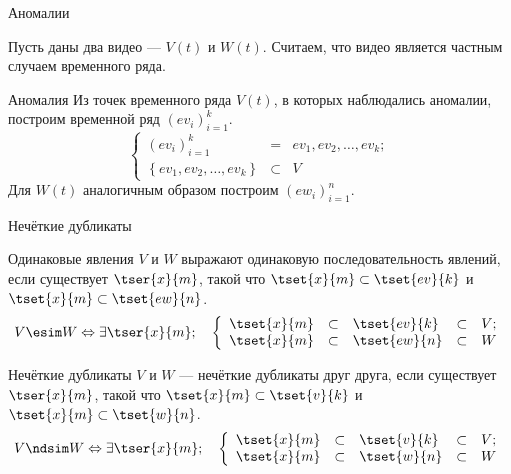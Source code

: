 \begin{frame}{Аномалии}
    \begin{blue-box}{}
        Пусть даны два видео — $V(t)$ и $W(t)$.
        Считаем, что видео является частным случаем временного ряда.
    \end{blue-box}
    \vspace{12pt}
    \begin{blue-box}{Аномалия}
        Из точек временного ряда $V(t)$, в которых наблюдались аномалии, 
        построим временной ряд $(ev_{i})^{k}_{i=1}$.
        \[
            \left\lbrace
                \begin{array}{lcl}
                    (ev_{i})^{k}_{i=1} & = &  ev_1, ev_2, \ldots, ev_k; \\
                    \left\lbrace ev_1, ev_2, \ldots, ev_k  \right\rbrace & \subset & V 
                \end{array}
            \right.
        \]
        Для $W(t)$ аналогичным образом построим  $(ew_{i})^{n}_{i=1}$.
    \end{blue-box}
\end{frame}



\begin{frame}{Нечёткие дубликаты}
    \begin{orange-box}{Одинаковые явления}
    $V$ и $W$ выражают одинаковую
    последовательность явлений, если существует $\tser{x}{m}$, 
    такой что $ \tset{x}{m} \subset \tset{ev}{k} $ 
    и~$ \tset{x}{m} \subset \tset{ew}{n}$.
    \[
        V \esim  W \Leftrightarrow  
        \exists \tser{x}{m}; \quad \left\lbrace
            \begin{array}{lclll}
                \tset{x}{m} & \subset 
                    & \tset{ev}{k} 
                    & \subset & V; \\
                \tset{x}{m} & \subset 
                    & \tset{ew}{n} 
                    & \subset & W 
            \end{array}
        \right.
    \]
    \end{orange-box}
        \vspace{12pt}
    \begin{gray-box}{Нечёткие дубликаты}
        $V$ и $W$ — нечёткие дубликаты друг друга,
        если существует $\tser{x}{m}$, 
        такой что $ \tset{x}{m} \subset \tset{v}{k} $ 
        и~$ \tset{x}{m} \subset \tset{w}{n}$.
        \[
            V \ndsim  W \Leftrightarrow 
            \exists \tser{x}{m}; \quad \left\lbrace
                \begin{array}{lclll}
                    \tset{x}{m} & \subset 
                        & \tset{v}{k} 
                        & \subset & V; \\
                    \tset{x}{m} & \subset 
                        & \tset{w}{n} 
                        & \subset & W 
                \end{array}
            \right.
        \]
    \end{gray-box}
\end{frame}


